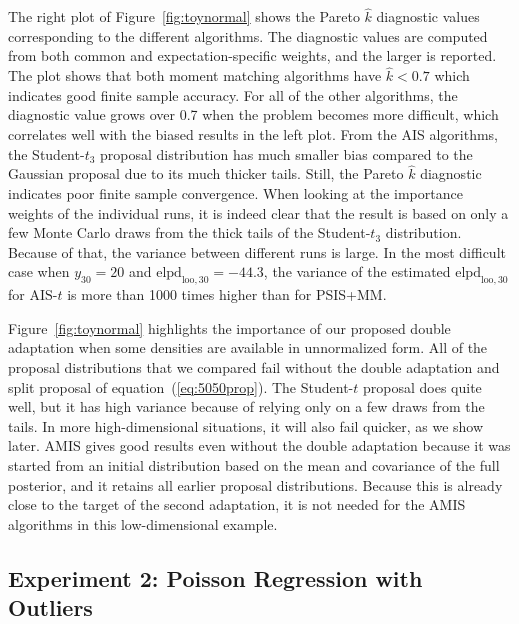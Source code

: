 \documentclass[12pt]{article}
\begin{document}
The right plot of Figure~\ref{fig:toynormal} shows the Pareto $\hat{k}$ diagnostic values
corresponding to the different algorithms. The diagnostic values are computed from both common
and expectation-specific weights, and the larger is reported. The plot shows that both moment
matching algorithms have $\hat{k} < 0.7$ which indicates good finite sample accuracy.
For all of the other algorithms, the diagnostic value grows over 0.7 when
the problem becomes more difficult, which correlates well with the biased results in the left plot.
From the AIS algorithms, the Student-$t_3$ proposal distribution has much smaller bias
compared to the Gaussian proposal due to its much thicker tails.
Still, the Pareto $\hat{k}$ diagnostic indicates poor finite sample convergence.
When looking at the importance weights of the individual runs, it is indeed clear
that the result is based on only a few Monte Carlo draws from the thick tails of the Student-$t_3$ distribution.
Because of that, the variance between different runs is
large. In the most difficult case when $y_{30} = 20$ and
$\text{elpd}_{\text{loo},30} = -44.3$, the variance of the estimated $\text{elpd}_{\text{loo},30}$
for $\text{AIS-}t$ is more than 1000 times higher than for PSIS+MM.





Figure~\ref{fig:toynormal} highlights the importance of our proposed double adaptation
when some densities are available in unnormalized form.
All of the proposal distributions that we compared
%
%
fail without the double adaptation and split proposal of equation~(\ref{eq:5050prop}).
The Student-$t$ proposal does quite well, but
it has high variance because of relying only on a few draws from the tails.
In more high-dimensional situations, it will also fail quicker, as we show later.
AMIS gives good results
even without the double adaptation because it was started from an initial distribution
based on the mean and covariance of the full posterior, and it retains all earlier proposal distributions.
Because this is already close to the target of the second adaptation, it is not needed for the AMIS algorithms
in this low-dimensional example.
%
%











\subsection{Experiment 2: Poisson Regression with Outliers} \label{sec:poisson}
\end{document}
